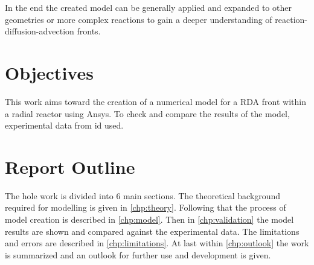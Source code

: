 \documentclass[../thesis.tex]{subfiles}
\begin{document}
In the end the created model can be generally applied and expanded to other geometries or more complex reactions to gain a deeper understanding of reaction-diffusion-advection fronts. 

\section{Objectives}

This work aims toward the creation of a numerical model for a RDA front within a radial reactor using Ansys. To check and compare the results of the model, experimental data from \cite{stergiou2022effects} id used.

\section{Report Outline}

The hole work is divided into 6 main sections. The theoretical background required for modelling is given in \autoref{chp:theory}. Following that the process of model creation is described in \autoref{chp:model}. Then in \autoref{chp:validation} the model results are shown and compared against the experimental data. The limitations and errors are described in \autoref{chp:limitations}. At last within \autoref{chp:outlook} the work is summarized and an outlook for further use and development is given.
\end{document}
